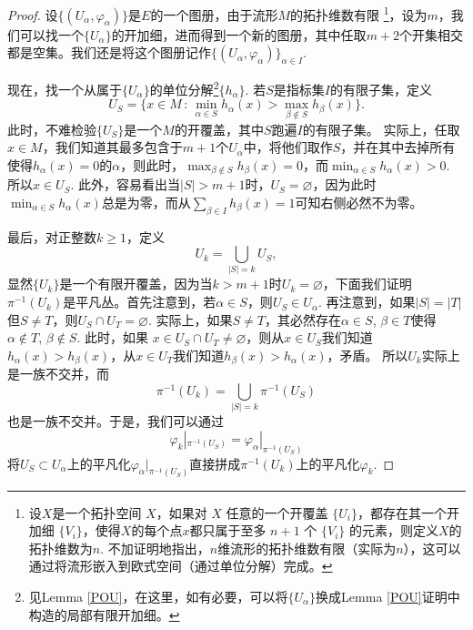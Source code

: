 \begin{proof}
	设$\{(U_\alpha,\varphi_\alpha)\}$是$E$的一个图册，由于流形$M$的拓扑维数有限
	\footnote{设$X$是一个拓扑空间 $X$，如果对 $X$ 任意的一个开覆盖 $\{U_i\}$，都存在其一个开加细 $\{V_i\}$，使得$X$的每个点$x$都只属于至多 $n+1$ 个 $\{V_i\}$
	的元素，则定义$X$的拓扑维数为$n$. 不加证明地指出，$n$维流形的拓扑维数有限（实际为$n$），这可以通过将流形嵌入到欧式空间（通过单位分解）完成。}，设为$m$，我们可以找一个$\{U_\alpha\}$的开加细，进而得到一个新的图册，其中任取$m+2$个开集相交都是空集。我们还是将这个图册记作$\{(U_\alpha,\varphi_\alpha)\}_{\alpha\in I}$.

	现在，找一个从属于$\{U_\alpha\}$的单位分解\footnote{见Lemma \ref{POU}，在这里，如有必要，可以将$\{U_\alpha\}$换成Lemma \ref{POU}证明中构造的局部有限开加细。}$\{h_\alpha\}$. 若$S$是指标集$I$的有限子集，定义
	\[
		U_S=\{x\in M\,:\, \min_{\alpha\in S}h_{\alpha}(x)>\max_{\beta\not\in S}h_\beta(x)\}.
	\]
	此时，不难检验$\{U_S\}$是一个$M$的开覆盖，其中$S$跑遍$I$的有限子集。
	实际上，任取$x\in M$，我们知道其最多包含于$m+1$个$U_\alpha$中，将他们取作$S$，并在其中去掉所有使得$h_{\alpha}(x)=0$的$\alpha$，则此时，$\max_{\beta\not\in S}h_\beta(x)=0$，而$\min_{\alpha\in S}h_{\alpha}(x)>0$.
	所以$x\in U_S$. 此外，容易看出当$|S|>m+1$时，$U_S=\varnothing$，因为此时$\min_{\alpha\in S}h_{\alpha}(x)$总是为零，而从$\sum_{\beta\in I}h_\beta(x)=1$可知右侧必然不为零。

	最后，对正整数$k\geq 1$，定义
	\[
		U_k=\bigcup_{|S|=k}U_S,
	\]
	显然$\{U_k\}$是一个有限开覆盖，因为当$k>m+1$时$U_k=\varnothing$，下面我们证明$\pi^{-1}(U_k)$是平凡丛。首先注意到，若$\alpha\in S$，则$U_S\in U_\alpha$. 再注意到，如果$|S|=|T|$但$S\neq T$，则$U_S\cap U_T=\varnothing$. 实际上，如果$S\neq T$，其必然存在$\alpha\in S$, $\beta\in T$使得$\alpha\not\in T$, $\beta\not\in S$. 此时，如果
	$x\in U_S\cap U_T\neq \varnothing$，则从$x\in U_S$我们知道$h_{\alpha}(x)>h_\beta(x)$，从$x\in U_T$我们知道$h_{\beta}(x)>h_\alpha(x)$，矛盾。
	所以$U_k$实际上是一族不交并，而
	\[
		\pi^{-1}(U_k)=\bigcup_{|S|=k}\pi^{-1}(U_S)
	\]
	也是一族不交并。于是，我们可以通过
	\[
		\varphi_k|_{\pi^{-1}(U_S)}=\varphi_{\alpha}|_{\pi^{-1}(U_S)}
	\]
	将$U_S\subset U_\alpha$上的平凡化$\varphi_{\alpha}|_{\pi^{-1}(U_S)}$直接拼成$\pi^{-1}(U_k)$上的平凡化$\varphi_k$.
\end{proof}

